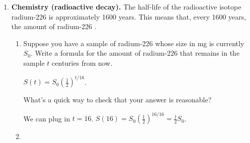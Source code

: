 \documentclass{article}
\providecommand{\check}{}
\renewcommand{\check}{\ifmmode{\text{ \ding{51} }}\else{\ding{51} }\fi}
\begin{document}
\begin{enumerate}
\begin{enumerate}
    \begin{problem}[\vfill\newpage]
      What if Marius had used a bank that offered 365 compounding periods a year? How much money would the account have after $t$ years, and what would the annual percentage yield be?
    \end{problem}

    \begin{solution}
      After $t$ years, he would have $\boxed{1000 \left(1 + \frac{0.06}{365} \right)^{365t}}$ dollars.

      The annual percentage yield (as a decimal) is then $\left( 1 + \frac{0.06}{365} \right)^365 - 1 \approx 0.06183$, or 6.138\%.
    \end{solution}

  \end{enumerate}

\item  \label{exp-radium-226} \textbf{Chemistry (radioactive decay).} The half-life of the radioactive isotope radium-226 is approximately 1600 years. This means that, every 1600 years, the amount of radium-226 .

  \begin{enumerate}
  \item
    \begin{problem}[\vfill]
      Suppose you have a sample of radium-226 whose size in mg is currently $S_0$. Write a formula for the amount of radium-226 that remains in the sample $t$ centuries from now.
    \end{problem}

    \begin{solution}
      $S(t) = S_0 \left( \frac{1}{2} \right)^{t / 16}$. 
    \end{solution}


    \begin{problem}[\stretch{0.25}]
      \check What's a quick way to check that your answer is reasonable?
    \end{problem}

    \begin{solution}
      We can plug in $t=16$. $S(16) = S_0\left(\frac{1}{2}\right)^{16/16} = \frac{1}{2}S_0$.
    \end{solution}

  \item


\end{enumerate}
\end{enumerate}
\end{document}
